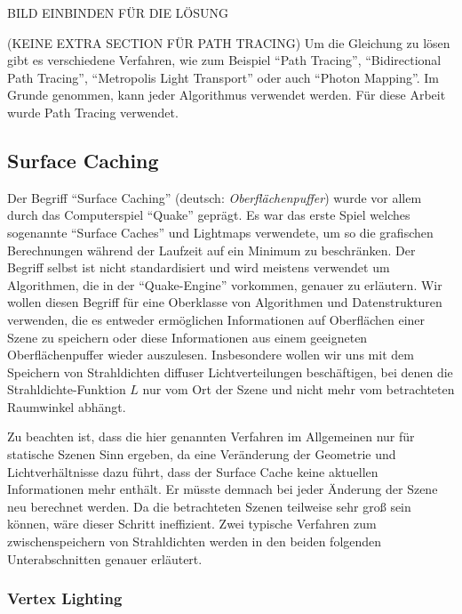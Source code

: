 		BILD EINBINDEN FÜR DIE LÖSUNG

		(KEINE EXTRA SECTION FÜR PATH TRACING)
		Um die Gleichung zu lösen gibt es verschiedene Verfahren, wie zum Beispiel \enquote{Path Tracing}, \enquote{Bidirectional Path Tracing}, \enquote{Metropolis Light Transport} oder auch \enquote{Photon Mapping}.
		Im Grunde genommen, kann jeder Algorithmus verwendet werden.
		Für diese Arbeit wurde Path Tracing verwendet.


	\subsection{Surface Caching} %
	\label{sub:surface_caching}

		Der Begriff \enquote{Surface Caching} (deutsch: \textit{Oberflächenpuffer}) wurde vor allem durch das Computerspiel \enquote{Quake} geprägt.
		Es war das erste Spiel welches sogenannte \enquote{Surface Caches} und Lightmaps verwendete, um so die grafischen Berechnungen während der Laufzeit auf ein Minimum zu beschränken.
		Der Begriff selbst ist nicht standardisiert und wird meistens verwendet um Algorithmen, die in der \enquote{Quake-Engine} vorkommen, genauer zu erläutern.
		Wir wollen diesen Begriff für eine Oberklasse von Algorithmen und Datenstrukturen verwenden, die es entweder ermöglichen Informationen auf Oberflächen einer Szene zu speichern oder diese Informationen aus einem geeigneten Oberflächenpuffer wieder auszulesen.
		Insbesondere wollen wir uns mit dem Speichern von Strahldichten diffuser Lichtverteilungen beschäftigen, bei denen die Strahldichte-Funktion $L$ nur vom Ort der Szene und nicht mehr vom betrachteten Raumwinkel abhängt.

		Zu beachten ist, dass die hier genannten Verfahren im Allgemeinen nur für statische Szenen Sinn ergeben, da eine Veränderung der Geometrie und Lichtverhältnisse dazu führt, dass der Surface Cache keine aktuellen Informationen mehr enthält.
		Er müsste demnach bei jeder Änderung der Szene neu berechnet werden.
		Da die betrachteten Szenen teilweise sehr groß sein können, wäre dieser Schritt ineffizient.
		Zwei typische Verfahren zum zwischenspeichern von Strahldichten werden in den beiden folgenden Unterabschnitten genauer erläutert.

		\subsubsection{Vertex Lighting} %
		\label{sub:vertex_lighting}

